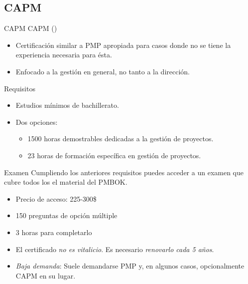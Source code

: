 \subsection{CAPM}

\begin{frame}[allowframebreaks]{CAPM}
	CAPM ()
	\begin{itemize}
		\item Certificación similar a PMP apropiada para casos donde no se tiene la experiencia necesaria para ésta.
		
		\item Enfocado a la gestión en general, no tanto a la dirección.
	\end{itemize}
	
	\begin{block}{Requisitos}
		\begin{itemize}
			\item Estudios mínimos de bachillerato.
			\item Dos opciones:
			\begin{itemize}
				\item 1500 horas demostrables dedicadas a la gestión de proyectos.
				\item 23 horas de formación específica en gestión de proyectos.
			\end{itemize}
		\end{itemize}
	\end{block}
	
	\framebreak
	
	\begin{block}{Examen}
		Cumpliendo los anteriores requisitos puedes acceder a un examen que cubre todos los el material del PMBOK.
		\begin{itemize}
		\item Precio de acceso: 225-300\$
		\item 150 preguntas de opción múltiple
		\item 3 horas para completarlo
		\end{itemize}
	\end{block}
	
	\begin{itemize}
		\item El certificado \emph{no es vitalicio}. Es necesario \emph{renovarlo cada 5 años}.
		
		\item \emph{Baja demanda}: Suele demandarse PMP y, en algunos casos, opcionalmente CAPM en su lugar.
	\end{itemize}
\end{frame}